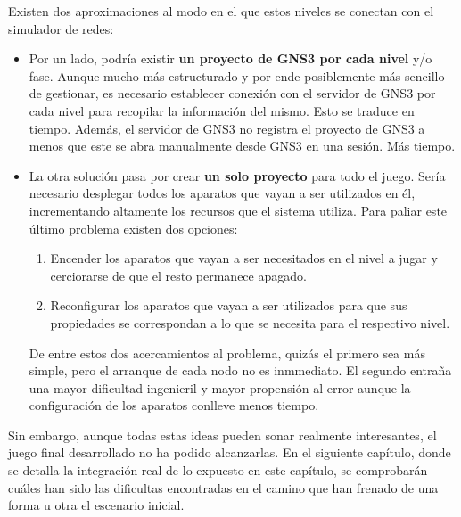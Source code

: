 Existen dos aproximaciones al modo en el que estos niveles se conectan con el simulador de redes:
\begin{itemize}
\item Por un lado, podría existir \textbf{un proyecto de GNS3 por cada nivel} y/o fase. Aunque mucho más estructurado y por ende posiblemente más sencillo de gestionar, es necesario establecer conexión con el servidor de GNS3 por cada nivel para recopilar la información del mismo. Esto se traduce en tiempo. Además, el servidor de GNS3 no registra el proyecto de GNS3 a menos que este se abra manualmente desde GNS3 en una sesión. Más tiempo.
\item La otra solución pasa por crear \textbf{un solo proyecto} para todo el juego. Sería necesario desplegar todos los aparatos que vayan a ser utilizados en él, incrementando altamente los recursos que el sistema utiliza. Para paliar este último problema existen dos opciones:
\begin{enumerate}
\item Encender los aparatos que vayan a ser necesitados en el nivel a jugar y cerciorarse de que el resto permanece apagado.
\item Reconfigurar los aparatos que vayan a ser utilizados para que sus propiedades se correspondan a lo que se necesita para el respectivo nivel.
\end{enumerate}
De entre estos dos acercamientos al problema, quizás el primero sea más simple, pero el arranque de cada nodo no es inmmediato. El segundo entraña una mayor dificultad ingenieril y mayor propensión al error aunque la configuración de los aparatos conlleve menos tiempo.
\end{itemize}

Sin embargo, aunque todas estas ideas pueden sonar realmente interesantes, el juego final desarrollado no ha podido alcanzarlas. En el siguiente capítulo, donde se detalla la integración real de lo expuesto en este capítulo, se comprobarán cuáles han sido las dificultas encontradas en el camino que han frenado de una forma u otra el escenario inicial. 